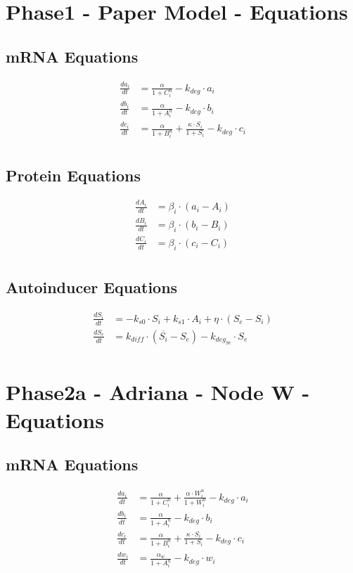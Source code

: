 \documentclass[fleqn]{article} %
\begin{document}
\section*{Phase1 - Paper Model - Equations}

\subsection*{mRNA Equations}
\begin{align*}
\frac{da_i}{dt} &= \frac{\alpha}{1 + C_i^n} - k_{deg} \cdot a_i \\
\frac{db_i}{dt} &= \frac{\alpha}{1 + A_i^n} - k_{deg} \cdot b_i \\
\frac{dc_i}{dt} &= \frac{\alpha}{1 + B_i^n} + \frac{\kappa \cdot S_i}{1 + S_i} - k_{deg} \cdot c_i \\
\end{align*}

\subsection*{Protein Equations}
\begin{align*}
\frac{dA_i}{dt} &= \beta_i \cdot (a_i - A_i) \\
\frac{dB_i}{dt} &= \beta_i \cdot (b_i - B_i) \\
\frac{dC_i}{dt} &= \beta_i \cdot (c_i - C_i) \\
\end{align*}

\subsection*{Autoinducer Equations}
\begin{align*}
\frac{dS_i}{dt} &= -k_{s0} \cdot S_i + k_{s1} \cdot A_i + \eta \cdot (S_e - S_i) \\
\frac{dS_e}{dt} &= k_{diff} \cdot (\overline{S_i} - S_e) - k_{deg_{Se}} \cdot S_e \\
\end{align*}

\pagebreak

\section*{Phase2a - Adriana - Node W - Equations}

\subsection*{mRNA Equations}
\begin{align*}
\frac{da_i}{dt} &= \frac{\alpha}{1 + C_i^n} +  \frac{\alpha \cdot W_i^n}{1 + W_i^n} - k_{deg} \cdot a_i \\
\frac{db_i}{dt} &= \frac{\alpha}{1 + A_i^n} - k_{deg} \cdot b_i \\
\frac{dc_i}{dt} &= \frac{\alpha}{1 + B_i^n} + \frac{\kappa \cdot S_i}{1 + S_i} - k_{deg} \cdot c_i \\
\frac{dw_i}{dt} &= \frac{\alpha_w}{1 + A_i^n} - k_{deg} \cdot w_i \\
\end{align*}
\end{document}
